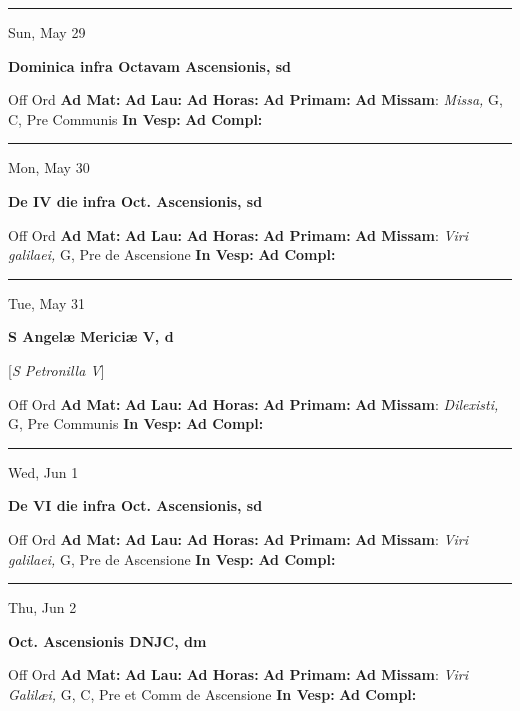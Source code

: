 \documentclass[letterpaper, 10pt]{article}
\begin{document}
\hrule
\begin{center}
Sun, May 29
\end{center}\textbf{ \large Dominica infra Octavam Ascensionis, \textnormal{\normalsize sd}}
\begin{justify}
Off Ord
\textbf{Ad Mat: }
\textbf{Ad Lau: }
\textbf{Ad Horas: }
\textbf{Ad Primam: }
\textbf{Ad Missam}: \textit{Missa,} G, C, Pre Communis
\textbf{In Vesp: }
\textbf{Ad Compl: }\end{justify}



\hrule
\begin{center}
Mon, May 30
\end{center}\textbf{ \large De IV die infra Oct. Ascensionis, \textnormal{\normalsize sd}}
\begin{justify}
Off Ord
\textbf{Ad Mat: }
\textbf{Ad Lau: }
\textbf{Ad Horas: }
\textbf{Ad Primam: }
\textbf{Ad Missam}: \textit{Viri galilaei,} G, Pre de Ascensione
\textbf{In Vesp: }
\textbf{Ad Compl: }\end{justify}



\hrule
\begin{center}
Tue, May 31
\end{center}\textbf{ \large S Angelæ Mericiæ V, \textnormal{\normalsize d}}

[\textit{S Petronilla V}]
\begin{justify}
Off Ord
\textbf{Ad Mat: }
\textbf{Ad Lau: }
\textbf{Ad Horas: }
\textbf{Ad Primam: }
\textbf{Ad Missam}: \textit{Dilexisti,} G, Pre Communis
\textbf{In Vesp: }
\textbf{Ad Compl: }\end{justify}



\hrule
\begin{center}
Wed, Jun 1
\end{center}\textbf{ \large De VI die infra Oct. Ascensionis, \textnormal{\normalsize sd}}
\begin{justify}
Off Ord
\textbf{Ad Mat: }
\textbf{Ad Lau: }
\textbf{Ad Horas: }
\textbf{Ad Primam: }
\textbf{Ad Missam}: \textit{Viri galilaei,} G, Pre de Ascensione
\textbf{In Vesp: }
\textbf{Ad Compl: }\end{justify}



\hrule
\begin{center}
Thu, Jun 2
\end{center}\textbf{ \large Oct. Ascensionis DNJC, \textnormal{\normalsize dm}}
\begin{justify}
Off Ord
\textbf{Ad Mat: }
\textbf{Ad Lau: }
\textbf{Ad Horas: }
\textbf{Ad Primam: }
\textbf{Ad Missam}: \textit{Viri Galilæi,} G, C, Pre et Comm de Ascensione
\textbf{In Vesp: }
\textbf{Ad Compl: }\end{justify}
\end{document}
